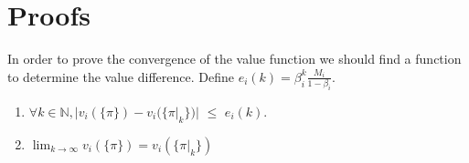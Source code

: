 \appendix

\section{Proofs}

In order to prove the convergence of the value function we should find a function to determine the value difference.\newline
Define $e_i(k)=\beta_i^{k}\frac{M_i}{1-\beta_i}$. 



\begin{lemma}
	\label{lem : conv_vi_path4}
	\begin{enumerate}
		\item $\forall k\in \mathbb{N}, |v_i(\{\pi\})-v_i(\{\pi|_k\})|$ $\le$ $e_i(k)$.	
		\item $\lim_{k\to\infty} v_i(\{\pi\})=v_i(\{\pi|_k\})$
		\end{enumerate}
		\end{lemma}
		
